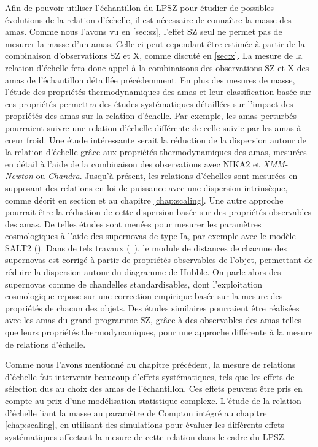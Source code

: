 Afin de pouvoir utiliser l'échantillon du LPSZ pour étudier de possibles évolutions de la relation d'échelle, il est nécessaire de connaître la masse des amas.
Comme nous l'avons vu en \ref{sec:sz}, l'effet SZ seul ne permet pas de mesurer la masse d'un amas.
Celle-ci peut cependant être estimée à partir de la combinaison d'observations SZ et X, comme discuté en \ref{sec:x}.
La mesure de la relation d'échelle fera donc appel à la combinaisons des observations SZ et X des amas de l'échantillon détaillée précédemment.
En plus des mesures de masse, l'étude des propriétés thermodynamiques des amas et leur classification basée sur ces propriétés permettra des études systématiques détaillées sur l'impact des propriétés des amas sur la relation d'échelle.
Par exemple, les amas perturbés pourraient suivre une relation d'échelle différente de celle suivie par les amas à cœur froid.
Une étude intéressante serait la réduction de la dispersion autour de la relation d'échelle grâce aux propriétés thermodynamiques des amas, mesurées en détail à l'aide de la combinaison des observations avec NIKA2 et \textit{XMM-Newton} ou \textit{Chandra}.
Jusqu'à présent, les relations d'échelles sont mesurées en supposant des relations en loi de puissance avec une dispersion intrinsèque, comme décrit en section  et au chapitre \ref{chap:scaling}.
Une autre approche pourrait être la réduction de cette dispersion basée sur des propriétés observables des amas.
De telles études sont menées pour mesurer les paramètres cosmologiques à l'aide des supernovas de type Ia, par exemple avec le modèle SALT2 (\cite{guy_salt2_2007}).
Dans de tels travaux (\eg\ \cite{betoule_improved_2014}), le module de distances de chacune des supernovas est corrigé à partir de propriétés observables de l'objet, permettant de réduire la dispersion autour du diagramme de Hubble.
On parle alors des supernovas comme de chandelles standardisables, dont l'exploitation cosmologique repose sur une correction empirique basée sur la mesure des propriétés de chacun des objets.
Des études similaires pourraient être réalisées avec les amas du grand programme SZ, grâce à des observables des amas telles que leurs propriétés thermodynamiques, pour une approche différente à la mesure de relations d'échelle.

Comme nous l'avons mentionné au chapitre précédent, la mesure de relations d'échelle fait intervenir beaucoup d'effets systématiques, tels que les effets de sélection dus au choix des amas de l'échantillon.
Ces effets peuvent être pris en compte au prix d'une modélisation statistique complexe.
L'étude de la relation d'échelle liant la masse au paramètre de Compton intégré au chapitre \ref{chap:scaling}, en utilisant des simulations pour évaluer les différents effets systématiques affectant la mesure de cette relation dans le cadre du LPSZ.

